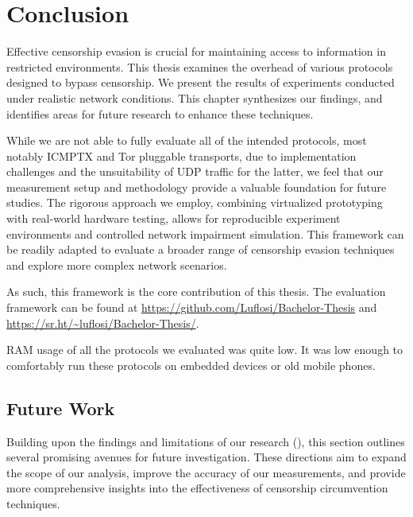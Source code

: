 
\chapter{Conclusion}
\label{chap:conclusion}

Effective censorship evasion is crucial for maintaining access to information in restricted environments.
This thesis examines the overhead of various protocols designed to bypass censorship.
We present the results of experiments conducted under realistic network conditions.
This chapter synthesizes our findings, and identifies areas for future research to enhance these techniques.

While we are not able to fully evaluate all of the intended protocols, most notably ICMPTX and Tor pluggable transports, due to implementation challenges and the unsuitability of UDP traffic for the latter, we feel that our measurement setup and methodology provide a valuable foundation for future studies.
The rigorous approach we employ, combining virtualized prototyping with real-world hardware testing, allows for reproducible experiment environments and controlled network impairment simulation.
This framework can be readily adapted to evaluate a broader range of censorship evasion techniques and explore more complex network scenarios.

As such, this framework is the core contribution of this thesis. The evaluation framework can be found at \href{https://github.com/Luflosi/Bachelor-Thesis}{https://github.com/Luflosi/Bachelor-Thesis} and \href{https://sr.ht/~luflosi/Bachelor-Thesis/}{https://sr.ht/\textasciitilde{}luflosi/Bachelor-Thesis/}.

RAM usage of all the protocols we evaluated was quite low.
It was low enough to comfortably run these protocols on embedded devices or old mobile phones.


\section{Future Work}
Building upon the findings and limitations of our research (), this section outlines several promising avenues for future investigation.
These directions aim to expand the scope of our analysis, improve the accuracy of our measurements, and provide more comprehensive insights into the effectiveness of censorship circumvention techniques.

